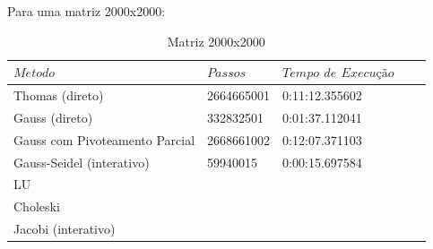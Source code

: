 \documentclass{article}
\begin{document}
\begin{itemize}
\newpage

\text Para uma matriz 2000x2000:

\begin{table}[h]
\centering
  \begin{tabular}{l||l|lll}
    $Metodo$ & $Passos$ & $Tempo$ $de$ $Execução$ \\
    \hline
    Thomas (direto) & 2664665001  & 0:11:12.355602 \\
    
    Gauss (direto) & 332832501 & 0:01:37.112041 \\
    
    Gauss com Pivoteamento Parcial & 2668661002 & 0:12:07.371103 \\
    
    Gauss-Seidel (interativo) & 59940015  &  0:00:15.697584 \\
    
    LU &  \\
    
    Choleski & \\
    
    Jacobi (interativo) & &  \\
    \hline
  \end{tabular}
  \caption{Matriz 2000x2000}
\end{table}



\end{itemize}
\end{document}
